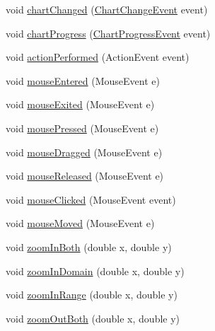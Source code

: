 \begin{DoxyCompactItemize}
void \mbox{\hyperlink{classorg_1_1jfree_1_1chart_1_1_chart_panel_a872d3011111149268824719983f616c7}{chart\+Changed}} (\mbox{\hyperlink{classorg_1_1jfree_1_1chart_1_1event_1_1_chart_change_event}{Chart\+Change\+Event}} event)
\item 
void \mbox{\hyperlink{classorg_1_1jfree_1_1chart_1_1_chart_panel_ab523b864bdd86dbe34cbc9c39a8b3763}{chart\+Progress}} (\mbox{\hyperlink{classorg_1_1jfree_1_1chart_1_1event_1_1_chart_progress_event}{Chart\+Progress\+Event}} event)
\item 
void \mbox{\hyperlink{classorg_1_1jfree_1_1chart_1_1_chart_panel_aa064b6bfa1945ec8089574a503bb8a67}{action\+Performed}} (Action\+Event event)
\item 
void \mbox{\hyperlink{classorg_1_1jfree_1_1chart_1_1_chart_panel_a80ffd135fa3a1042d62678302b411aa3}{mouse\+Entered}} (Mouse\+Event e)
\item 
void \mbox{\hyperlink{classorg_1_1jfree_1_1chart_1_1_chart_panel_acdeed34a32e5e8af75a3f63a8e42e143}{mouse\+Exited}} (Mouse\+Event e)
\item 
void \mbox{\hyperlink{classorg_1_1jfree_1_1chart_1_1_chart_panel_aea412d87c4c960cf3d44e558dee3dc25}{mouse\+Pressed}} (Mouse\+Event e)
\item 
void \mbox{\hyperlink{classorg_1_1jfree_1_1chart_1_1_chart_panel_a46b8f90fd0ec86c8c3903ac33eb993fd}{mouse\+Dragged}} (Mouse\+Event e)
\item 
void \mbox{\hyperlink{classorg_1_1jfree_1_1chart_1_1_chart_panel_a16fdfefd179c8141a2395d4326c966f3}{mouse\+Released}} (Mouse\+Event e)
\item 
void \mbox{\hyperlink{classorg_1_1jfree_1_1chart_1_1_chart_panel_a74e83cf3565cf9f26ac19d86f889b032}{mouse\+Clicked}} (Mouse\+Event event)
\item 
void \mbox{\hyperlink{classorg_1_1jfree_1_1chart_1_1_chart_panel_aed25d44a4cd73cb21b7433fa7406c9b8}{mouse\+Moved}} (Mouse\+Event e)
\item 
void \mbox{\hyperlink{classorg_1_1jfree_1_1chart_1_1_chart_panel_a22a96ae585b1776e540b3e5c0f261ec3}{zoom\+In\+Both}} (double x, double y)
\item 
void \mbox{\hyperlink{classorg_1_1jfree_1_1chart_1_1_chart_panel_aac0b052931bf20e0ea076b9faec0a94e}{zoom\+In\+Domain}} (double x, double y)
\item 
void \mbox{\hyperlink{classorg_1_1jfree_1_1chart_1_1_chart_panel_a98f40cb1439bcc2669f4dfb1ecb62c5d}{zoom\+In\+Range}} (double x, double y)
\item 
void \mbox{\hyperlink{classorg_1_1jfree_1_1chart_1_1_chart_panel_a87751a15d69cd4cead5bd85292d04909}{zoom\+Out\+Both}} (double x, double y)

\end{DoxyCompactItemize}
